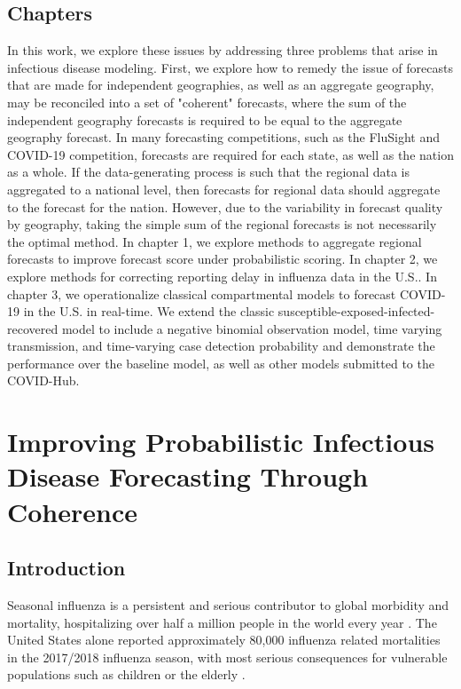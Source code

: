 \documentclass{umassthesis}          %
\begin{document}
   
 \section{Chapters}  
           In this work, we explore these issues by addressing three problems that arise in infectious disease modeling. First, we explore how to remedy the issue of forecasts that are made for independent geographies, as well as an aggregate geography, may be reconciled into a set of "coherent" forecasts, where the sum of the independent geography forecasts is required to be equal to the aggregate geography forecast. In many forecasting competitions, such as the FluSight and COVID-19 competition, forecasts are required for each state, as well as the nation as a whole. If the data-generating process is such that the regional data is aggregated to a national level, then forecasts for regional data should aggregate to the forecast for the nation. However, due to the variability in forecast quality by geography, taking the simple sum of the regional forecasts is not necessarily the optimal method. In chapter 1, we explore methods to aggregate regional forecasts to improve forecast score under probabilistic scoring. In chapter 2, we explore methods for correcting reporting delay in influenza data in the U.S.. In chapter 3, we operationalize classical compartmental models to forecast COVID-19 in the U.S. in real-time. We extend the classic susceptible-exposed-infected-recovered model to include a negative binomial observation model, time varying transmission, and time-varying case detection probability and demonstrate the performance over the baseline model, as well as other models submitted to the COVID-Hub.
\chapter{Improving Probabilistic Infectious Disease Forecasting Through Coherence}
\section{Introduction}
Seasonal influenza is a persistent and serious contributor to global morbidity and mortality, hospitalizing over half a million people in the world every year \cite{lafond2016global}. The United States alone reported approximately 80,000 influenza related mortalities in the 2017/2018 influenza season, with most serious consequences for vulnerable populations such as children or the elderly \cite{reed2015estimating}.
\end{document}
